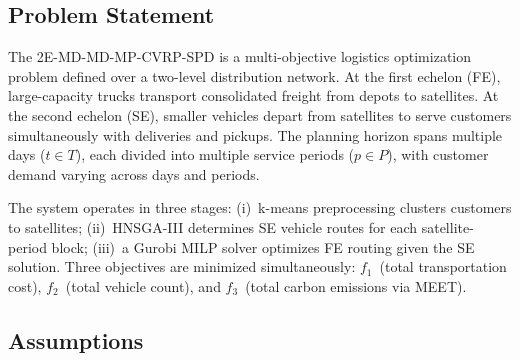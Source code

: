 \documentclass[11pt, a4paper]{article}
\numberwithin{equation}{section}
\begin{document}
\subsection{Problem Statement}

The 2E-MD-MD-MP-CVRP-SPD is a multi-objective logistics optimization problem
defined over a two-level distribution network.  At the first echelon (FE),
large-capacity trucks transport consolidated freight from depots to satellites.
At the second echelon (SE), smaller vehicles depart from satellites to serve
customers simultaneously with deliveries and pickups.  The planning horizon
spans multiple days ($t\in T$), each divided into multiple service periods
($p\in P$), with customer demand varying across days and periods.

The system operates in three stages: (i)~k-means preprocessing clusters
customers to satellites; (ii)~HNSGA-III determines SE vehicle routes for each
satellite-period block; (iii)~a Gurobi MILP solver optimizes FE routing given
the SE solution.  Three objectives are minimized simultaneously:
$f_1$~(total transportation cost), $f_2$~(total vehicle count), and
$f_3$~(total carbon emissions via MEET).

\subsection{Assumptions}
\end{document}
